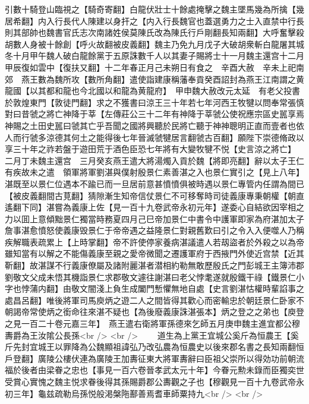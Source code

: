 引數十騎登山臨視之【騎奇寄翻】白龍伏壯士十餘處掩擊之魏主墜馬幾為所擒【幾居希翻】内入行長代人陳建以身扞之【内入行長魏官也蓋選勇力之士入直禁中行長則其部帥也魏書官氏志次南諸姓侯莫陳氏改為陳氏行戶剛翻長知兩翻】大呼奮擊殺胡數人身被十餘創【呼火故翻被皮義翻】魏主乃免九月戊子大破胡衆斬白龍屠其城冬十月甲午魏人破白龍餘黨于五原誅數千人以其妻子賜將士十一月魏主還宫十二月甲辰復如雲中【復扶又翻】十二年春正月己未朔日有食之　辛酉大赦　辛未上祀南郊　燕王數為魏所攻【數所角翻】遣使詣建康稱藩奉貢癸酉詔封為燕王江南謂之黄龍國【以其都和龍也今北國以和龍為黄龍府】　甲申魏大赦改元太延　有老父投書於敦煌東門【敦徒門翻】求之不獲書曰涼王三十年若七年河西王牧犍以問奉常張慎對曰昔虢之將亡神降于莘【左傳莊公三十二年有神降于莘虢公使祝應宗區史嚚享焉神賜之土田史嚚曰虢其亡乎吾聞之國將興聽於民將亡聽于神神聰明正直而壹者也依人而行虢多涼德其何土之能得後七年晉滅虢犍居言翻虢古百翻】願陛下崇德脩政以享三十年之祚若盤于遊田荒于酒色臣恐七年將有大變牧犍不悦【史言涼之將亡】　二月丁未魏主還宫　三月癸亥燕王遣大將湯燭入貢於魏【將即亮翻】辭以太子王仁有疾故未之遣　領軍將軍劉湛與僕射殷景仁素善湛之入也景仁實引之【見上八年】湛既至以景仁位遇本不踰已而一旦居前意甚憤憤俱被時遇以景仁專管内任謂為間已【被皮義翻間古莧翻】猜隙漸生知帝信仗景仁不可移奪時司徒義康專秉朝權【朝直遙翻下同】湛嘗為義康上佐【見一百十九卷武帝永初元年】遂委心自結欲因宰相之力以囬上意傾黜景仁獨當時務夏四月己巳帝加景仁中書令中護軍即家為府湛加太子詹事湛愈憤怒使義康毁景仁于帝帝遇之益隆景仁對親舊歎曰引之令入入便噬人乃稱疾解職表疏累上【上時掌翻】帝不許使停家養病湛議遣人若刼盜者於外殺之以為帝雖知當有以解之不能傷義康至親之愛帝微聞之遷護軍府于西掖門外使近宫禁【近其靳翻】故湛謀不行義康僚屬及諸附麗湛者潜相約勒無敢歷殷氏之門彭城王主簿沛郡劉敬文父成未悟其機詣景仁求郡敬文遽往謝湛曰老父悖耄遂就殷鐵干祿【鐵景仁小字也悖蒲内翻】由敬文闇淺上負生成闔門慙懼無地自處【史言劉湛怙權時輩諂事之處昌呂翻】唯後將軍司馬庾炳之遊二人之間皆得其歡心而密輸忠於朝廷景仁卧家不朝謁帝常使炳之銜命往來湛不疑也【為後廢義康誅湛張本】炳之登之之弟也【庾登之見一百二十卷元嘉三年】　燕王遣右衛將軍孫德來乞師五月庚申魏主進宜都公穆夀爵為王汝隂公長孫<br />
<br />
　　道生為上黨王宜城公奚斤為恒農王【奚斤先封宜城王以罪降為公魏顯祖諱弘乃改弘農為恒農史以後來郡名書之長知兩翻恒戶登翻】廣陵公樓伏連為廣陵王加夀征東大將軍夀辭曰臣祖父崇所以得効功前朝流福於後者由梁眷之忠也【事見一百六卷晉孝武太元十年】今眷元勲未錄而臣獨奕世受賞心實愧之魏主悦求眷後得其孫賜爵郡公夀觀之子也【穆觀見一百十九卷武帝永初三年】龜兹疏勒烏孫悦般渇槃陁鄯善焉耆車師粟持九<br />
<br />
